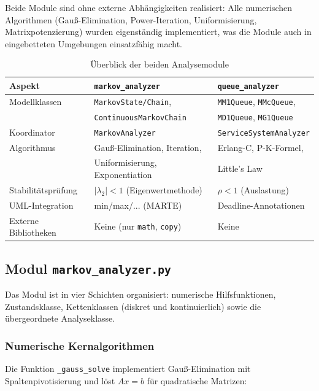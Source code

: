 ﻿\documentclass[a4paper,12pt]{scrreprt}
\theoremstyle{definition}
\begin{document}
Beide Module sind ohne externe Abhängigkeiten realisiert: Alle numerischen
Algorithmen (Gauß-Elimination, Power-Iteration, Uniformisierung,
Matrixpotenzierung) wurden eigenständig implementiert, was die Module
auch in eingebetteten Umgebungen einsatzfähig macht.

\begin{table}[H]
	\centering
	\begin{tabular}{@{}lll@{}}
		\toprule
		\textbf{Aspekt} & \textbf{\texttt{markov\_analyzer}} & \textbf{\texttt{queue\_analyzer}} \\
		\midrule
		Modellklassen & \texttt{MarkovState/Chain}, &
		\texttt{MM1Queue}, \texttt{MMcQueue}, \\
		& \texttt{ContinuousMarkovChain} & \texttt{MD1Queue}, \texttt{MG1Queue} \\
		Koordinator & \texttt{MarkovAnalyzer} & \texttt{ServiceSystemAnalyzer} \\
		Algorithmus & Gauß-Elimination, Iteration, & Erlang-C, P-K-Formel, \\
		& Uniformisierung, Exponentiation & Little's Law \\
		Stabilitätsprüfung & $|\lambda_2| < 1$ (Eigenwertmethode) & $\rho < 1$ (Auslastung) \\
		UML-Integration & min/max/... (MARTE) & Deadline-Annotationen \\
		Externe Bibliotheken & Keine (nur \texttt{math}, \texttt{copy}) & Keine \\
		\bottomrule
	\end{tabular}
	\caption{Überblick der beiden Analysemodule}
	\label{tab:module-uebersicht}
\end{table}

\subsection{Modul \texttt{markov\_analyzer.py}}
\label{sec:markov-analyzer-impl}

Das Modul ist in vier Schichten organisiert: numerische Hilfsfunktionen,
Zustandsklasse, Kettenklassen (diskret und kontinuierlich) sowie die
übergeordnete Analyseklasse.

\subsubsection{Numerische Kernalgorithmen}

Die Funktion \texttt{\_gauss\_solve} implementiert Gauß-Elimination mit
Spaltenpivotisierung und löst $Ax = b$ für quadratische Matrizen:
\end{document}
